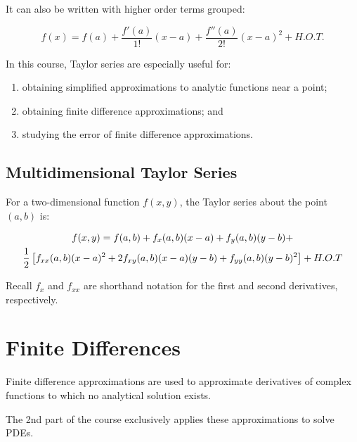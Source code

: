 \documentclass[12pt]{article}
\begin{document}
\vspace{6mm}

It can also be written with higher order terms grouped:

\vspace{6mm}

$$f(x) = f(a) + \frac{f'(a)}{1!}(x-a) + \frac{f''(a)}{2!}(x-a)^2 + H.O.T.$$  

\vspace{6mm}

In this course, Taylor series are especially useful for:
\begin{enumerate}
\item obtaining simplified approximations to analytic functions near a point;
\item obtaining finite difference approximations; and
\item studying the error of finite difference approximations.
\end{enumerate} 

\subsection{Multidimensional Taylor Series}

For a two-dimensional function $f(x,y)$, the Taylor series about the point $(a,b)$ is:

\begin{multline*}
f(x,y) = f(a,b) + f_x(a,b)(x-a) + f_y(a,b)(y-b) + \\ \frac{1}{2}\left[f_{xx}(a,b)(x-a)^2 + 2f_{xy}(a,b)(x-a)(y-b) + f_{yy}(a,b)(y-b)^2\right] + H.O.T $$
\end{multline*}

\vspace{4mm}

Recall $f_x$ and $f_{xx}$ are shorthand notation for the first and second derivatives, respectively.


\pagebreak

\section{Finite Differences}

Finite difference approximations are used to approximate derivatives of complex functions to which no analytical solution exists.

\vspace{4mm}

The 2nd part of the course exclusively applies these approximations to solve PDEs.
\end{document}
